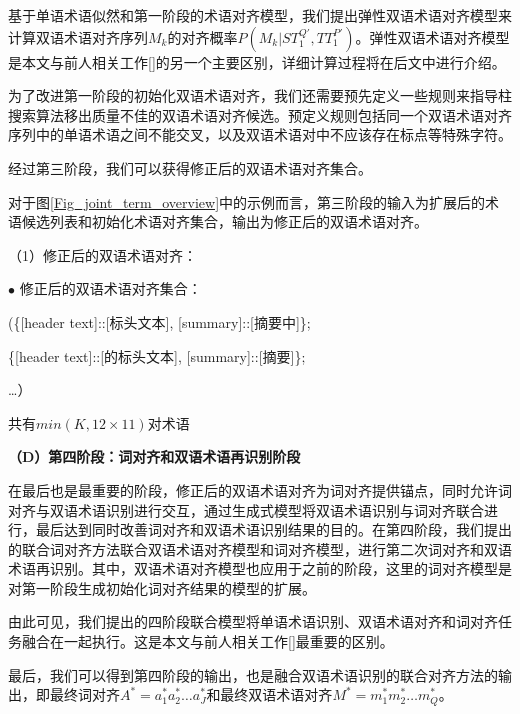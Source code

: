基于单语术语似然和第一阶段的术语对齐模型，我们提出弹性双语术语对齐模型来计算双语术语对齐序列$M_k$的对齐概率$P(M_k|ST_1^{Q'}, TT_1^{P'})$。弹性双语术语对齐模型是本文与前人相关工作[\cite{Chen:2010,Chen:2012}]的另一个主要区别，详细计算过程将在后文中进行介绍。

为了改进第一阶段的初始化双语术语对齐，我们还需要预先定义一些规则来指导柱搜索算法移出质量不佳的双语术语对齐候选。预定义规则包括同一个双语术语对齐序列中的单语术语之间不能交叉，以及双语术语对中不应该存在标点等特殊字符。

经过第三阶段，我们可以获得修正后的双语术语对齐集合。

对于图\ref{Fig_joint_term_overview}中的示例而言，第三阶段的输入为扩展后的术语候选列表和初始化术语对齐集合，输出为修正后的双语术语对齐。

\begin{center}
	\begin{boxedminipage}[h]{\linewidth}
		\small		
		\quad （1）修正后的双语术语对齐：
		
		\qquad\qquad $\bullet$ 修正后的双语术语对齐集合：
		
		\qquad\qquad\qquad (\{[header text]::[标头文本], [summary]::[摘要中]\};
		
		\qquad\qquad\qquad \{[header text]::[的标头文本], [summary]::[摘要]\};
		
		\qquad\qquad\qquad …）
		
		\qquad\qquad\quad 共有$min(K, 12 \times 11)$对术语
	\end{boxedminipage}
\end{center}

\textbf{（D）第四阶段：词对齐和双语术语再识别阶段}

在最后也是最重要的阶段，修正后的双语术语对齐为词对齐提供锚点，同时允许词对齐与双语术语识别进行交互，通过生成式模型将双语术语识别与词对齐联合进行，最后达到同时改善词对齐和双语术语识别结果的目的。在第四阶段，我们提出的联合词对齐方法联合双语术语对齐模型和词对齐模型，进行第二次词对齐和双语术语再识别。其中，双语术语对齐模型也应用于之前的阶段，这里的词对齐模型是对第一阶段生成初始化词对齐结果的模型的扩展。

由此可见，我们提出的四阶段联合模型将单语术语识别、双语术语对齐和词对齐任务融合在一起执行。这是本文与前人相关工作[\cite{Chen:2010,Chen:2012,Wang:2013a}]最重要的区别。

最后，我们可以得到第四阶段的输出，也是融合双语术语识别的联合对齐方法的输出，即最终词对齐$A^*=a_1^*a_2^*\ldots a_J^*$和最终双语术语对齐$M^*=m_1^* m_2^*\ldots m_Q^*$。

